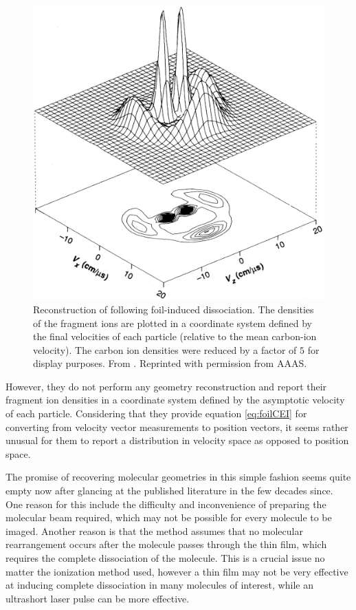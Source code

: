 \begin{figure}
  \centering
  \includegraphics[width=\textwidth]{gfx/VagerPseudoGeometry}
  \caption[Reconstruction of  following foil-induced dissociation.]
  {Reconstruction of  following foil-induced dissociation. The densities of the fragment ions are plotted in a coordinate system defined by the final velocities of each particle (relative to the mean carbon-ion velocity). The carbon ion densities were reduced by a factor of $5$ for display purposes. From \citet{Vager89}. Reprinted with permission from AAAS.}
  \label{fig:C2H3geometry}
\end{figure}

However, they do not perform any geometry reconstruction and report their fragment ion densities in a coordinate system defined by the asymptotic velocity of each particle. Considering that they provide equation \eqref{eq:foilCEI} for converting from velocity vector measurements to position vectors, it seems rather unusual for them to report a distribution in velocity space as opposed to position space.

The promise of recovering molecular geometries in this simple fashion seems quite empty now after glancing at the published literature in the few decades since. One reason for this include the difficulty and inconvenience of preparing the molecular beam required, which may not be possible for every molecule to be imaged. Another reason is that the method assumes that no molecular rearrangement occurs after the molecule passes through the thin film, which requires the complete dissociation of the molecule. This is a crucial issue no matter the ionization method used, however a thin film may not be very effective at inducing complete dissociation in many molecules of interest, while an ultrashort laser pulse can be more effective.

